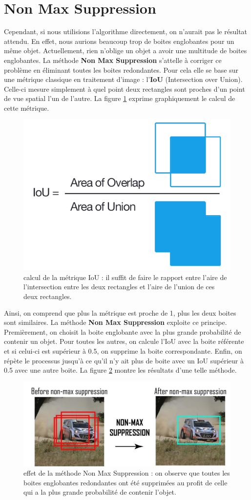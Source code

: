 \section{Non Max Suppression}

Cependant, si nous utilisions l'algorithme directement, on n'aurait pas le résultat attendu. En effet, nous aurions beaucoup trop de boites englobantes pour un même objet. Actuellement, rien n'oblige un objet a avoir une multitude de boites englobantes. La méthode \textbf{Non Max Suppression} s'attelle à corriger ce problème en éliminant toutes les boites redondantes. Pour cela elle se base sur une métrique classique en traitement d'image : l'\textbf{IoU} (Intersection over Union). Celle-ci mesure simplement à quel point deux rectangles sont proches d'un point de vue spatial l'un de l'autre. La figure \ref{IoU} exprime graphiquement le calcul de cette métrique.

\begin{figure}[!h]
\centering
\includegraphics[width=100pts]{images/Mask_R_CNN/IoU.png} 
\caption{calcul de la métrique IoU : il suffit de faire le rapport entre l'aire de l'intersection entre les deux rectangles et l'aire de l'union de ces deux rectangles.}
\label{IoU}
\end{figure}

Ainsi, on comprend que plus la métrique est proche de 1, plus les deux boites sont similaires. La méthode \textbf{Non Max Suppression} exploite ce principe. Premièrement, on choisit la boite englobante avec la plus grande probabilité de contenir un objet. Pour toutes les autres, on calcule l'IoU avec la boite référente et si celui-ci est supérieur à 0.5, on supprime la boite correspondante. Enfin, on répète le processus jusqu'à ce qu'il n'y ait plus de boite avec un IoU supérieur à 0.5 avec une autre boite. La figure \ref{non_max_suppression} montre les résultats d'une telle méthode.

\begin{figure}[!h]
\centering
\includegraphics[width=200pts]{images/Mask_R_CNN/non_max_suppression.png} 
\caption{effet de la méthode Non Max Suppression : on observe que toutes les boites englobantes redondantes ont été supprimées au profit de celle qui a la plus grande probabilité de contenir l'objet.}
\label{non_max_suppression}
\end{figure}

